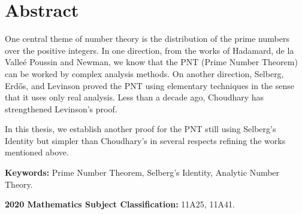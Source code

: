 \chapter*{Abstract}
One central theme of number theory is the distribution
of the prime numbers over the positive integers.
In one direction,
from the works of
Hadamard, de la Valle\'e Poussin and Newman,
we know that the PNT (Prime Number Theorem)
can be worked by complex analysis methods.
On another direction,
Selberg, Erdős, and Levinson proved the PNT
using elementary techniques in the sense that
it uses only real analysis.
Less than a decade ago,
Choudhary has strengthened Levinson's proof.

In this thesis,
we establish another proof for the PNT
still using Selberg's Identity
but simpler than Choudhary's in several respects
refining the works mentioned above.

\bigskip
\textbf{Keywords:}
Prime Number Theorem,
Selberg's Identity,
Analytic Number Theory.

\bigskip
\textbf{2020 Mathematics Subject Classification:}
11A25,
11A41.

\setcounter{page}{4}
